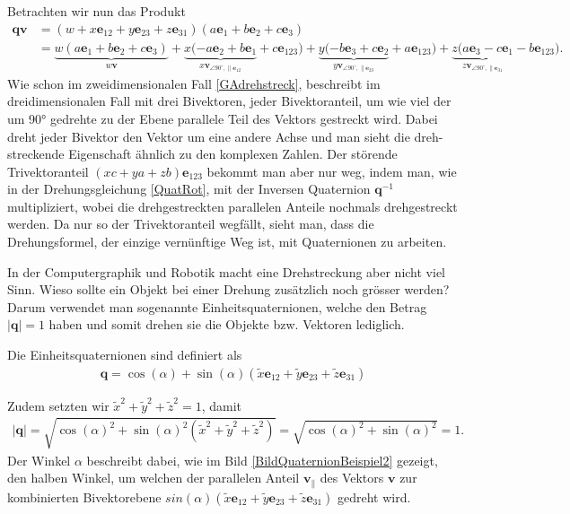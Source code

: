Betrachten wir nun das Produkt
\begin{align}
\mathbf{qv} &= (w + x\mathbf{e}_{12} + y\mathbf{e}_{23} + z\mathbf{e}_{31})(a\mathbf{e}_1+b\mathbf{e}_2+c\mathbf{e}_3)\\
&= \underbrace{w(a\mathbf{e}_1+b\mathbf{e}_2+c\mathbf{e}_3)}_{\displaystyle{w\mathbf{v}}} + \underbrace{x(-a\mathbf{e}_2+b\mathbf{e}_1}_{\displaystyle{x\mathbf{v}_{\angle 90^\circ, \parallel \mathbf{e}_{12}}}}+c\mathbf{e}_{123}) + \underbrace{y(-b\mathbf{e}_3+c\mathbf{e}_2}_{\displaystyle{y\mathbf{v}_{\angle 90^\circ, \parallel \mathbf{e}_{23}}}}+a\mathbf{e}_{123}) + \underbrace{z(a\mathbf{e}_3-c\mathbf{e}_1}_{\displaystyle{z\mathbf{v}_{\angle 90^\circ, \parallel \mathbf{e}_{31}}}}-b\mathbf{e}_{123}).
\end{align}
Wie schon im zweidimensionalen Fall \eqref{GAdrehstreck}, beschreibt im dreidimensionalen Fall mit drei Bivektoren, jeder Bivektoranteil, um wie viel der um 90° gedrehte zu der Ebene parallele Teil des Vektors gestreckt wird. Dabei dreht jeder Bivektor den Vektor um eine andere Achse und man sieht die dreh-streckende Eigenschaft ähnlich zu den komplexen Zahlen. Der störende Trivektoranteil $(xc+ya+zb)\mathbf{e}_{123}$ bekommt man aber nur weg, indem man, wie in der Drehungsgleichung \eqref{QuatRot}, mit der Inversen Quaternion $\mathbf{q}^{-1}$  multipliziert, wobei die drehgestreckten parallelen Anteile nochmals drehgestreckt werden. Da nur so der Trivektoranteil wegfällt, sieht man, dass die Drehungsformel, der einzige vernünftige Weg ist, mit Quaternionen zu arbeiten.

In der Computergraphik und Robotik macht eine Drehstreckung aber nicht viel Sinn. Wieso sollte ein Objekt bei einer Drehung zusätzlich noch grösser werden? Darum verwendet man sogenannte Einheitsquaternionen, welche den Betrag $|\mathbf{q}|=1$ haben und somit drehen sie die Objekte bzw. Vektoren lediglich.
\begin{definition}
	Die Einheitsquaternionen sind definiert als
	\begin{align}
	\mathbf{q} = \cos(\alpha) + \sin(\alpha)(\tilde{x}\mathbf{e}_{12} + \tilde{y}\mathbf{e}_{23} + \tilde{z}\mathbf{e}_{31})
	\end{align}
\end{definition}
Zudem setzten wir $\tilde{x}^2+\tilde{y}^2+\tilde{z}^2=1$, damit
\begin{align}
|\mathbf{q}| = \sqrt{\cos(\alpha)^2 + \sin(\alpha)^2(\tilde{x}^2+\tilde{y}^2+\tilde{z}^2) } = \sqrt{\cos(\alpha)^2 + \sin(\alpha)^2} = 1.
\end{align}
Der Winkel $\alpha$ beschreibt dabei, wie im Bild \ref{BildQuaternionBeispiel2} gezeigt, den halben Winkel, um welchen der parallelen Anteil $\mathbf{v_{\parallel}}$ des Vektors $\mathbf{v}$ zur kombinierten Bivektorebene $sin(\alpha)(\tilde{x}\mathbf{e}_{12} + \tilde{y}\mathbf{e}_{23} + \tilde{z}\mathbf{e}_{31})$ gedreht wird.

